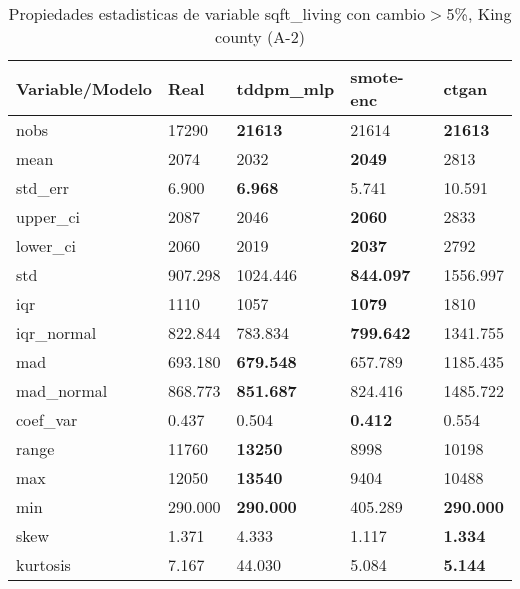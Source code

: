 \begin{table}[H]
\centering
\fontsize{8}{14}\selectfont
\caption{Propiedades estadisticas de variable sqft\_living con cambio\ensuremath{>}5\%, King county (A-2)}
\label{table-stats-king county-a-2-sqft_living-short}
\begin{tabular}{|l|m{10em}|m{10em}|m{10em}|m{10em}|}
\hline
 \rowcolor[gray]{0.8}
Variable/Modelo & Real & tddpm\_mlp & smote-enc & ctgan \\
\hline nobs & 17290 & \bfseries 21613 & \cellcolor[rgb]{0.9, 0.54, 0.52} 21614 & \bfseries 21613 \\
\hline mean & 2074 & 2032 & \bfseries 2049 & \cellcolor[rgb]{0.9, 0.54, 0.52} 2813 \\
\hline std\_err & 6.900 & \bfseries 6.968 & 5.741 & \cellcolor[rgb]{0.9, 0.54, 0.52} 10.591 \\
\hline upper\_ci & 2087 & 2046 & \bfseries 2060 & \cellcolor[rgb]{0.9, 0.54, 0.52} 2833 \\
\hline lower\_ci & 2060 & 2019 & \bfseries 2037 & \cellcolor[rgb]{0.9, 0.54, 0.52} 2792 \\
\hline std & 907.298 & 1024.446 & \bfseries 844.097 & \cellcolor[rgb]{0.9, 0.54, 0.52} 1556.997 \\
\hline iqr & 1110 & 1057 & \bfseries 1079 & \cellcolor[rgb]{0.9, 0.54, 0.52} 1810 \\
\hline iqr\_normal & 822.844 & 783.834 & \bfseries 799.642 & \cellcolor[rgb]{0.9, 0.54, 0.52} 1341.755 \\
\hline mad & 693.180 & \bfseries 679.548 & 657.789 & \cellcolor[rgb]{0.9, 0.54, 0.52} 1185.435 \\
\hline mad\_normal & 868.773 & \bfseries 851.687 & 824.416 & \cellcolor[rgb]{0.9, 0.54, 0.52} 1485.722 \\
\hline coef\_var & 0.437 & 0.504 & \bfseries 0.412 & \cellcolor[rgb]{0.9, 0.54, 0.52} 0.554 \\
\hline range & 11760 & \bfseries 13250 & \cellcolor[rgb]{0.9, 0.54, 0.52} 8998 & 10198 \\
\hline max & 12050 & \bfseries 13540 & \cellcolor[rgb]{0.9, 0.54, 0.52} 9404 & 10488 \\
\hline min & 290.000 & \bfseries 290.000 & \cellcolor[rgb]{0.9, 0.54, 0.52} 405.289 & \bfseries 290.000 \\
\hline skew & 1.371 & \cellcolor[rgb]{0.9, 0.54, 0.52} 4.333 & 1.117 & \bfseries 1.334 \\
\hline kurtosis & 7.167 & \cellcolor[rgb]{0.9, 0.54, 0.52} 44.030 & 5.084 & \bfseries 5.144 \\

\end{tabular}
\end{table}
